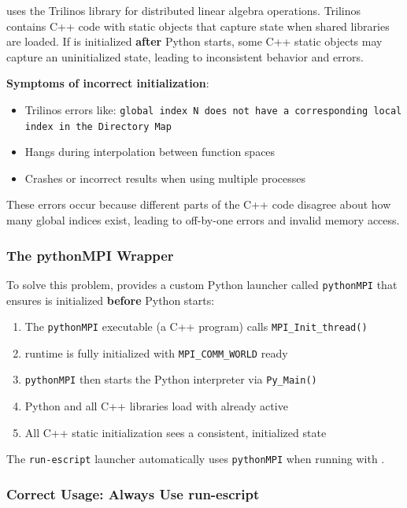 \escript uses the Trilinos library for distributed linear algebra operations. Trilinos contains C++ code with static objects that capture \MPI state when shared libraries are loaded. If \MPI is initialized \textbf{after} Python starts, some C++ static objects may capture an uninitialized \MPI state, leading to inconsistent behavior and errors.

\textbf{Symptoms of incorrect initialization}:
\begin{itemize}
\item Trilinos errors like: \texttt{global index N does not have a corresponding local index in the Directory Map}
\item Hangs during interpolation between function spaces
\item Crashes or incorrect results when using multiple \MPI processes
\end{itemize}

These errors occur because different parts of the C++ code disagree about how many global indices exist, leading to off-by-one errors and invalid memory access.

\subsubsection{The pythonMPI Wrapper}

To solve this problem, \escript provides a custom Python launcher called \texttt{pythonMPI} that ensures \MPI is initialized \textbf{before} Python starts:

\begin{enumerate}
\item The \texttt{pythonMPI} executable (a C++ program) calls \texttt{MPI\_Init\_thread()}
\item \MPI runtime is fully initialized with \texttt{MPI\_COMM\_WORLD} ready
\item \texttt{pythonMPI} then starts the Python interpreter via \texttt{Py\_Main()}
\item Python and all C++ libraries load with \MPI already active
\item All C++ static initialization sees a consistent, initialized \MPI state
\end{enumerate}

The \texttt{run-escript} launcher automatically uses \texttt{pythonMPI} when running with \MPI.

\subsubsection{Correct Usage: Always Use run-escript}

